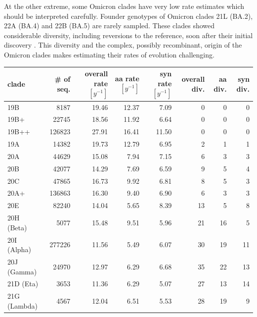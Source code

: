 \documentclass[aps,rmp, twocolumn]{revtex4}
\begin{document}
At the other extreme, some Omicron clades have very low rate estimates which should be interpreted carefully.
Founder genotypes of Omicron clades 21L (BA.2), 22A (BA.4) and 22B (BA.5) are rarely sampled.
These clades showed considerable diversity, including reversions to the reference, soon after their initial discovery \citep{tegally_emergence_2022}.
This diversity and the complex, possibly recombinant, origin of the Omicron clades makes estimating their rates of evolution challenging.


\begin{table}
\begin{tabular}{l|rrrrrrr}
    \hline
    {\bf clade} & \# of seq. & overall rate $[y^{-1}]$ & aa rate $[y^{-1}]$ &  syn rate $[y^{-1}]$ & overall div. &  aa div. &  syn div. \\
    \hline
    19B &           8187 & 19.46 &    12.37 &      7.09 &        0 &       0 &        0 \\
   19B+ &           22745 & 18.56 &    11.92 &      6.64 &        0 &       0 &        0 \\
  19B++ &           126823 & 27.91 &    16.41 &     11.50 &        0 &       0 &        0 \\
  19A &             14382 & 19.73 &    12.79 &      6.95 &        2 &       1 &        1 \\
  20A &             44629 & 15.08 &     7.94 &      7.15 &        6 &       3 &        3 \\
    20B &           42077 & 14.29 &     7.69 &      6.59 &        9 &       5 &        4 \\
    20C &           47865 & 16.73 &     9.92 &      6.81 &        8 &       5 &        3 \\
   20A+ &           136863 & 16.30 &     9.40 &      6.90 &        6 &       3 &        3 \\
    20E &           82240 & 14.04 &     5.65 &      8.39 &       13 &       5 &        8 \\
    20H (Beta) &    5077 & 15.48 &     9.51 &      5.96 &       21 &      16 &        5 \\
    20I (Alpha) &   277226 & 11.56 &     5.49 &      6.07 &       30 &      19 &       11 \\
    20J (Gamma) &   24970 & 12.97 &     6.29 &      6.68 &       35 &      22 &       13 \\
    21D (Eta) &     3653 & 11.36 &     6.29 &      5.07 &       27 &      13 &       14 \\
    21G (Lambda) &  4567 & 12.04 &     6.51 &      5.53 &       28 &      19 &        9 \\

\end{tabular}
\end{table}
\end{document}
